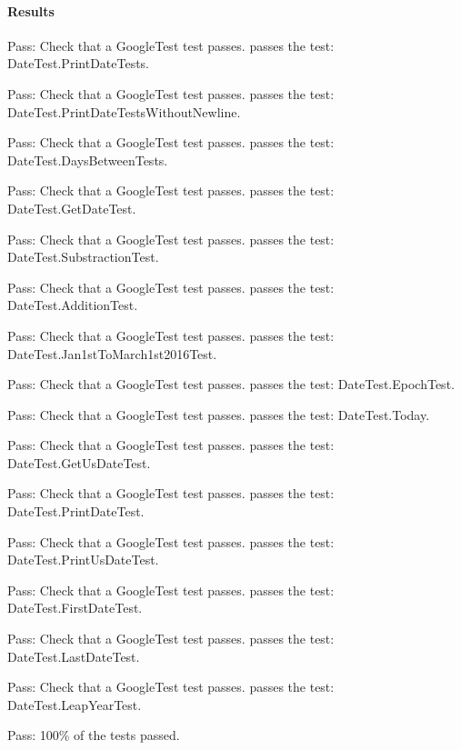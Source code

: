 \paragraph*{Results}


\begin{DoxyItemize}
\item Pass\+: Check that a Google\+Test test passes. passes the test\+: Date\+Test.\+Print\+Date\+Tests.
\item Pass\+: Check that a Google\+Test test passes. passes the test\+: Date\+Test.\+Print\+Date\+Tests\+Without\+Newline.
\item Pass\+: Check that a Google\+Test test passes. passes the test\+: Date\+Test.\+Days\+Between\+Tests.
\item Pass\+: Check that a Google\+Test test passes. passes the test\+: Date\+Test.\+Get\+Date\+Test.
\item Pass\+: Check that a Google\+Test test passes. passes the test\+: Date\+Test.\+Substraction\+Test.
\item Pass\+: Check that a Google\+Test test passes. passes the test\+: Date\+Test.\+Addition\+Test.
\item Pass\+: Check that a Google\+Test test passes. passes the test\+: Date\+Test.\+Jan1st\+To\+March1st2016\+Test.
\item Pass\+: Check that a Google\+Test test passes. passes the test\+: Date\+Test.\+Epoch\+Test.
\item Pass\+: Check that a Google\+Test test passes. passes the test\+: Date\+Test.\+Today.
\item Pass\+: Check that a Google\+Test test passes. passes the test\+: Date\+Test.\+Get\+Us\+Date\+Test.
\item Pass\+: Check that a Google\+Test test passes. passes the test\+: Date\+Test.\+Print\+Date\+Test.
\item Pass\+: Check that a Google\+Test test passes. passes the test\+: Date\+Test.\+Print\+Us\+Date\+Test.
\item Pass\+: Check that a Google\+Test test passes. passes the test\+: Date\+Test.\+First\+Date\+Test.
\item Pass\+: Check that a Google\+Test test passes. passes the test\+: Date\+Test.\+Last\+Date\+Test.
\item Pass\+: Check that a Google\+Test test passes. passes the test\+: Date\+Test.\+Leap\+Year\+Test.
\item Pass\+: 100\% of the tests passed.
\end{DoxyItemize}

